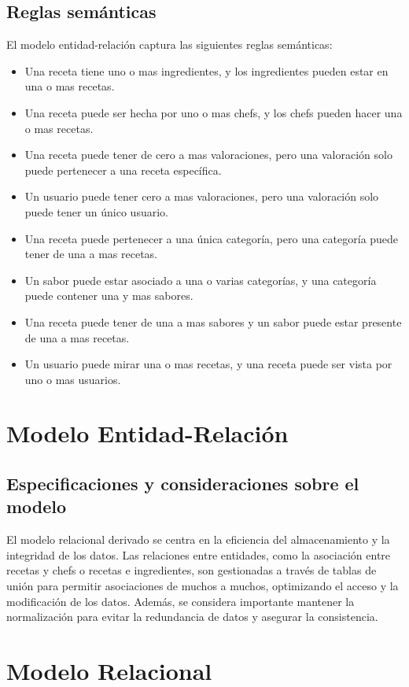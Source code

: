 \documentclass[12pt,a4paper]{article}
\begin{document}
\subsection{Reglas semánticas}
El modelo entidad-relación captura las siguientes reglas semánticas:
\begin{itemize}
    \item Una receta tiene uno o mas ingredientes, y los ingredientes pueden estar en una o mas recetas.
    \item Una receta puede ser hecha por uno o mas chefs, y los chefs pueden hacer una o mas recetas.
    \item Una receta puede tener de cero a mas valoraciones, pero una valoración solo puede pertenecer a una receta específica.
    \item Un usuario puede tener cero a mas valoraciones, pero una valoración solo puede tener un único usuario.
    \item Una receta puede pertenecer a una única categoría, pero una categoría puede tener  de una a mas recetas.
    \item Un sabor puede estar asociado a una o varias categorías, y una categoría puede contener una y mas sabores. 
    \item Una receta puede tener de una a mas sabores y un sabor puede estar presente de una a mas recetas.
    \item Un usuario puede mirar una o mas recetas, y una receta puede ser vista por uno o mas usuarios.
\end{itemize}

\section{Modelo Entidad-Relación}

\subsection{Especificaciones y consideraciones sobre el modelo}
El modelo relacional derivado se centra en la eficiencia del almacenamiento y la integridad de los datos. Las relaciones entre entidades, como la asociación entre recetas y chefs o recetas e ingredientes, son gestionadas a través de tablas de unión para permitir asociaciones de muchos a muchos, optimizando el acceso y la modificación de los datos. Además, se considera importante mantener la normalización para evitar la redundancia de datos y asegurar la consistencia.

\section{Modelo Relacional}
\end{document}
